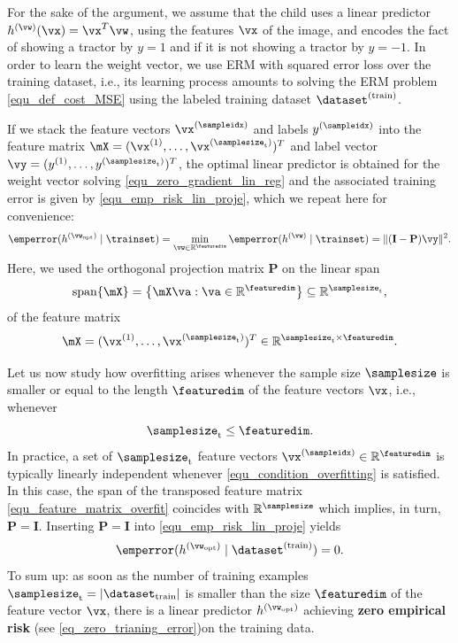 \documentclass[12pt]{report}
\begin{document}
For the sake of the argument, we assume that the child uses a linear predictor 
$h^{(\vw)}(\vx) = \vx^{T} \vw$, using the features $\vx$ of the image, and encodes 
the fact of showing a tractor by $y=1$ and if it is not showing a tractor by $y=-1$. 
In order to learn the weight vector, we use ERM with squared error loss over the 
training dataset, i.e., its learning process amounts to solving the ERM problem 
\eqref{equ_def_cost_MSE} using the labeled training dataset $ \dataset^{(\rm train)}$. 

If we stack the feature vectors $\vx^{(\sampleidx)}$ and labels $y^{(\sampleidx)}$ into 
the feature matrix $\mX=(\vx^{(1)},\ldots,\vx^{(\samplesize_{\rm t})})^{T}$ and label 
vector $\vy=(y^{(1)},\ldots,y^{(\samplesize_{\rm t})})^{T}$, the optimal linear predictor 
is obtained for the weight vector solving \eqref{equ_zero_gradient_lin_reg} 
and the associated training error is given by \eqref{equ_emp_risk_lin_proje}, which 
we repeat here for convenience: 
\begin{equation}
\emperror(h^{(\vw_{\rm opt})} \mid \trainset) = \min_{\vw \in \mathbb{R}^{\featuredim}} \emperror(h^{(\vw)} \mid \trainset) = \|  (\mathbf{I}- \mathbf{P}) \vy \|^{2}.
\end{equation} 
Here, we used the orthogonal projection matrix $\mathbf{P}$ on the linear span 
\begin{equation} 
\nonumber
{\rm span}\{ \mX \} = \big\{  \mX \va : \va \in \mathbb{R}^{\featuredim} \big\} \subseteq \mathbb{R}^{\samplesize_{\rm t}} , 
\end{equation}
of the feature matrix 
\begin{equation} 
\label{equ_feature_matrix_overfit}
\mX = (\vx^{(1)},\ldots,\vx^{(\samplesize_{\rm t})})^{T} \in \mathbb{R}^{  \samplesize_{\rm t} \times \featuredim}. 
\end{equation} 

Let us now study how overfitting arises whenever the sample size $\samplesize$ is 
smaller or equal to the length $\featuredim$ of the feature vectors $\vx$, i.e., whenever 
\begin{equation} 
\label{equ_condition_overfitting}
\samplesize_{\rm t} \leq \featuredim. 
\end{equation} 
In practice, a set of $\samplesize_{\rm t}$ feature vectors $\vx^{(\sampleidx)} \in \mathbb{R}^{\featuredim}$ is 
typically linearly independent whenever \eqref{equ_condition_overfitting} is satisfied. In this case, the span of 
the transposed feature matrix \eqref{equ_feature_matrix_overfit} coincides with $\mathbb{R}^{\samplesize}$ 
which implies, in turn, $\mathbf{P} = \mathbf{I}$. Inserting $\mathbf{P} = \mathbf{I}$ into \eqref{equ_emp_risk_lin_proje} 
yields 
\begin{equation}
\label{eq_zero_trianing_error}
\emperror(h^{(\vw_{\rm opt})} \mid \dataset^{(\rm train)}) = 0.
\end{equation} 
To sum up: as soon as the number of training examples $\samplesize_{\rm t} = | \dataset_{\rm train}|$ is smaller 
than the size $\featuredim$ of the feature vector $\vx$, there is a linear predictor $h^{(\vw_{\rm opt})}$ achieving 
{\bf zero empirical risk} (see \eqref{eq_zero_trianing_error})on the training data. 
\end{document}
